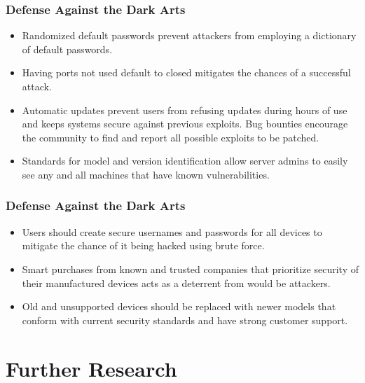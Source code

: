 \documentclass{beamer}
\begin{document}
\begin{frame}
    \frametitle{Defense Against the Dark Arts}
    \begin{itemize}
        \item Randomized default passwords prevent attackers from employing a dictionary of default passwords.
        \item Having ports not used default to closed mitigates the chances of a successful attack.
        \item Automatic updates prevent users from refusing updates during hours of use and keeps systems secure against previous exploits. Bug bounties encourage the community to find and report all possible exploits to be patched.
        \item Standards for model and version identification allow server admins to easily see any and all machines that have known vulnerabilities.
    \end{itemize}
\end{frame}
\begin{frame}
    \frametitle{Defense Against the Dark Arts}
    \begin{itemize}
        \item Users should create secure usernames and passwords for all devices to mitigate the chance of it being hacked using brute force.
        \item Smart purchases from known and trusted companies that prioritize security of their manufactured devices acts as a deterrent from would be attackers.
        \item Old and unsupported devices should be replaced with newer models that conform with current security standards and have strong customer support.
    \end{itemize}
    
\end{frame}

\section{Further Research}
\end{document}
